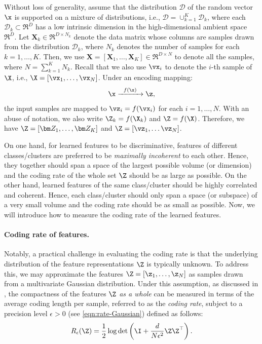 \documentclass[../../book-main.tex]{subfiles}
\begin{document}
Without loss of generality, assume that the distribution $\mathcal D$ of the random vector $\x$ is supported on a mixture of distributions, i.e., $\mathcal D = \cup_{k=1}^K \mathcal{D}_k$,  where each $\mathcal{D}_k \subset \Re^D$ has a low intrinsic dimension in the high-dimensional ambient space $\Re^D$. Let $\bm X_k \in \Re^{D\times N_k}$ denote the data matrix whose columns are samples drawn from the distribution $\mathcal{D}_k$, where $N_k$ denotes the number of samples for each $k=1,\dots,K$. Then, we use $\bm X=[\bm X_1,\dots,\bm X_K] \in \Re^{D\times N}$ to denote all the samples, where $N=\sum_{k=1}^K N_k$. 
Recall that we also use $\vx_i$ to denote the $i$-th sample of $\X$, i.e., $\X=[\vx_1,\dots,\vx_N] $. Under an encoding mapping:
\begin{equation}
	\x   \xrightarrow{\hspace{2mm} f(\x)\hspace{2mm}} \z,
\end{equation}
the input samples are mapped to $\vz_i = f(\vx_i)$ for each $i=1,\dots,N$. With an abuse of notation, we also write $\Z_k = f(\X_k)$ and $\Z = f(\X)$. Therefore, we have $\Z = [\bm Z_1,\dots,\bm Z_K]$ and $\Z = [\vz_1,\dots\vz_N]$. 

On one hand, for learned features to be discriminative, features of different classes/clusters are preferred to be {\em maximally incoherent} to each other. Hence, they together should span a space of the largest possible volume (or dimension) and the coding rate of the whole set $\Z$ should be as large as possible. On the other hand, learned features of the same class/cluster should be highly correlated and coherent. Hence, each class/cluster should only span a space (or subspace) of a very small volume and the coding rate should be as small as possible. Now, we will introduce how to measure the coding rate of the learned features.  

\paragraph{Coding rate of features.} Notably, a practical challenge in evaluating the coding rate is that the underlying distribution of the feature representations $\Z$ is typically unknown. To address this, we may approximate the features $\Z = [\z_1, \ldots, \z_N]$ as samples drawn from a multivariate Gaussian distribution. Under this assumption, as discussed in , the compactness of the features $\Z$ {\em as a whole} can be measured in terms of the average coding length per sample, referred to as the {\em coding rate}, subject to a precision level $\epsilon > 0$ (see \eqref{eqn:rate-Gaussian}) defined as follows:
\begin{equation}
	R_{\epsilon}(\Z) = \frac{1}{2}\log\det\left(\I + \frac{d}{N\epsilon^{2}}\Z\Z^{\top}\right).
	\label{chap4-eqn:coding-length-eval}
\end{equation}
\end{document}
